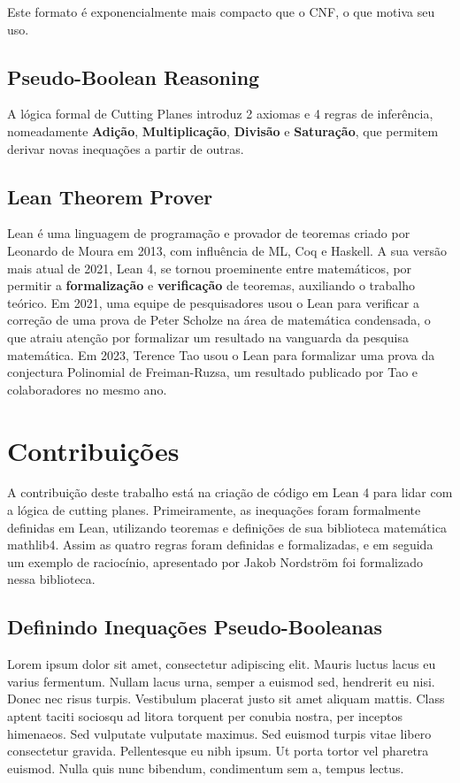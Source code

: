 \documentclass[conference]{IEEEtran}
\begin{document}
Este formato é exponencialmente mais compacto que o CNF, o que motiva seu uso\cite{PBSolve}.

\subsection{Pseudo-Boolean Reasoning}
A lógica formal de Cutting Planes introduz 2 axiomas e 4 regras de inferência, nomeadamente
\textbf{Adição}, \textbf{Multiplicação}, \textbf{Divisão} e \textbf{Saturação},
que permitem derivar novas inequações a partir de outras\cite{CutPlane}.

\subsection{Lean Theorem Prover}
Lean é uma linguagem de programação e provador de teoremas criado por Leonardo de Moura em 2013\cite{LeanProver}, com
influência de ML, Coq e Haskell.
A sua versão mais atual de 2021, Lean 4\cite{Lean4}, se tornou proeminente entre matemáticos, por permitir a
\textbf{formalização} e \textbf{verificação} de teoremas, auxiliando o trabalho teórico.
Em 2021, uma equipe de pesquisadores usou o Lean para verificar a correção de uma prova de Peter Scholze na área
de matemática condensada\cite{LTE}, o que atraiu atenção por formalizar um resultado na vanguarda da pesquisa matemática.
Em 2023, Terence Tao usou o Lean para formalizar uma prova da conjectura Polinomial de Freiman-Ruzsa\cite{PFR},
um resultado publicado por Tao e colaboradores no mesmo ano.

\section{Contribuições}
A contribuição deste trabalho está na criação de código em Lean 4 para lidar com a lógica de cutting planes.
Primeiramente, as inequações foram formalmente definidas em Lean, utilizando teoremas e definições de sua biblioteca
matemática mathlib4\cite{mathlib4}. Assim as quatro regras foram definidas e formalizadas, e em seguida um exemplo de
raciocínio, apresentado por Jakob Nordström foi formalizado nessa biblioteca.

\subsection{Definindo Inequações Pseudo-Booleanas}
Lorem ipsum dolor sit amet, consectetur adipiscing elit. Mauris luctus lacus eu varius fermentum. Nullam lacus urna, semper a euismod sed, hendrerit eu nisi. Donec nec risus turpis. Vestibulum placerat justo sit amet aliquam mattis. Class aptent taciti sociosqu ad litora torquent per conubia nostra, per inceptos himenaeos. Sed vulputate vulputate maximus. Sed euismod turpis vitae libero consectetur gravida. Pellentesque eu nibh ipsum. Ut porta tortor vel pharetra euismod. Nulla quis nunc bibendum, condimentum sem a, tempus lectus.
\end{document}

